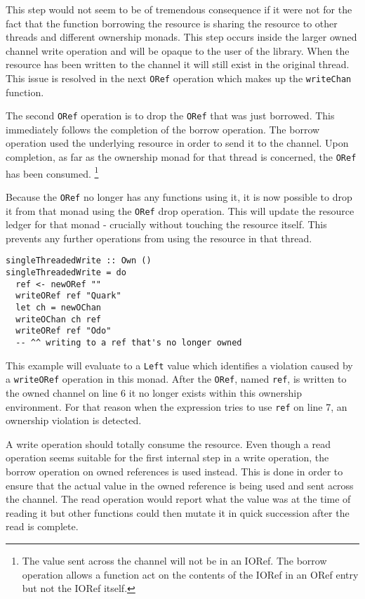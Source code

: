 \documentclass[onehalf,11pt]{beavtex}
\begin{document}
This step would not seem to be of tremendous consequence if it were not for the
fact that the function borrowing the resource is sharing the resource
to other threads and different ownership monads.
This step occurs inside the larger owned channel write operation and will
be opaque to the user of the library.
When the resource has been written to the channel it will still exist in the
original thread.
This issue is resolved in the next \texttt{ORef} operation which
makes up the \texttt{writeChan} function.

The second \texttt{ORef} operation is to drop the \texttt{ORef} that was just
borrowed. This immediately follows the completion of the borrow operation. The
borrow operation used the underlying resource in order to send it to the channel.
Upon completion, as far as the ownership monad for that thread is
concerned, the \texttt{ORef} has been consumed.
\footnote{The value sent across the channel will not be in an IORef.
  The borrow operation allows a function act on the contents of the IORef in
  an ORef entry but not the IORef itself.}

Because the \texttt{ORef} no longer has any functions using it, it is now
possible to drop it from that monad using the \texttt{ORef} drop operation.
This will update the resource ledger for that monad - crucially without
touching the resource itself.
This prevents any further operations from using the resource
in that thread.

\begin{lstlisting}
singleThreadedWrite :: Own ()
singleThreadedWrite = do
  ref <- newORef ""
  writeORef ref "Quark"
  let ch = newOChan
  writeOChan ch ref
  writeORef ref "Odo"
  -- ^^ writing to a ref that's no longer owned
\end{lstlisting}

This example will evaluate to a \texttt{Left} value which identifies a
violation caused by a \texttt{writeORef} operation in this monad.
After the \texttt{ORef}, named \texttt{ref}, is written to the owned channel on
line 6 it no longer exists within this ownership environment.
For that reason when the expression tries to use \texttt{ref} on line 7, an
ownership violation is detected.

A write operation should totally consume the resource.
Even though a read operation seems suitable for the first internal step in a
write operation, the borrow operation on owned references is used instead.
This is done in order to ensure that the actual value in the owned reference is
being used and sent across the channel.
The read operation would report what the value was at the time of reading it but
other functions could then mutate it in quick succession after the read is
complete. %
\end{document}
